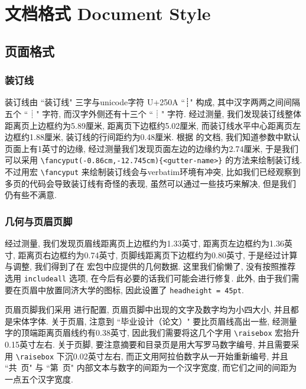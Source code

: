 
\section{文档格式 Document Style}

\subsection{页面格式}

\subsubsection{装订线}

装订线由 ``装订线" 三字与unicode字符 U+250A ``┊" 构成, 其中汉字两两之间间隔五个 ``┊" 字符, 而汉字外侧还有十三个 ``┊" 字符. 经过测量, 我们发现装订线整体距离页上边框约为5.89厘米, 距离页下边框约5.02厘米, 而装订线水平中心距离页左边框约1.88厘米, 装订线的行间距约为0.48厘米. 根据  的文档, 我们知道参数中默认页面上有1英寸的边缘, 经过测量我们发现页面左边的边缘约为2.74厘米, 于是我们可以采用 \verb|\fancyput(-0.86cm,-12.745cm){<gutter-name>}| 的方法来绘制装订线. 不过用宏 \verb|\fancyput| 来绘制装订线会与verbatim环境有冲突, 比如我们已经观察到多页的代码会导致装订线有奇怪的表现, 虽然可以通过一些技巧来解决, 但是我们仍有些不满意.

\subsubsection{几何与页眉页脚}

经过测量, 我们发现页眉线距离页上边框约为1.33英寸, 距离页左边框约为1.36英寸, 距离页右边框约为0.74英寸, 页脚线距离页下边框约为0.80英寸, 于是经过计算与调整, 我们得到了在  宏包中应提供的几何数据. 这里我们偷懒了, 没有按照推荐选用 \verb|includeall| 选项, 在今后有必要的话我们可能会进行修复. 此外, 由于我们需要在页眉中放置同济大学的图标, 因此设置了 \verb|headheight = 45pt|.

页眉页脚我们采用  进行配置, 页眉页脚中出现的文字及数字均为小四大小, 并且都是宋体字体. 关于页眉, 注意到 ``毕业设计（论文）" 要比页眉线高出一些, 经测量字的顶端距离页眉线约有0.38英寸, 因此我们需要将这几个字用 \verb|\raisebox| 宏抬升0.15英寸左右. 关于页脚, 要注意摘要和目录页是用大写罗马数字编号, 并且需要采用 \verb|\raisebox| 下沉0.02英寸左右, 而正文用阿拉伯数字从一开始重新编号, 并且 ``共\ 页" 与 ``第\ 页" 内部文本与数字的间距为一个汉字宽度, 而它们之间的间距为一点五个汉字宽度.

